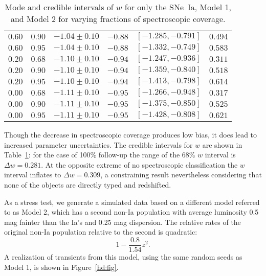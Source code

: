 \documentclass[preprint]{elsarticle}
\begin{document}
\begin{table}
\begin{tabular}{|c|c|cccc|}
$0.60$ &$0.90$ &$-1.04 \pm 0.10$ &$-0.88$ & $[-1.285, -0.791]$ & $0.494$ \\
$0.60$ &$0.95$ &$-1.04 \pm 0.10$ &$-0.88$ & $[-1.332, -0.749]$ & $0.583$ \\
$0.20$ &$0.68$ &$-1.10 \pm 0.10$ &$-0.94$ & $[-1.247, -0.936]$ & $0.311$ \\
$0.20$ &$0.90$ &$-1.10 \pm 0.10$ &$-0.94$ & $[-1.359, -0.840]$ & $0.518$ \\
$0.20$ &$0.95$ &$-1.10 \pm 0.10$ &$-0.94$ & $[-1.413, -0.798]$ & $0.614$ \\
$0.00$ &$0.68$ &$-1.11 \pm 0.10$ &$-0.95$ & $[-1.266, -0.948]$ & $0.317$ \\
$0.00$ &$0.90$ &$-1.11 \pm 0.10$ &$-0.95$ & $[-1.375, -0.850]$ & $0.525$ \\
$0.00$ &$0.95$ &$-1.11 \pm 0.10$ &$-0.95$ & $[-1.428, -0.808]$ & $0.621$ \\
\hline
\end{tabular}
\caption{Mode and credible intervals of $w$ for only the SNe~Ia, Model 1, and Model 2 for varying
fractions of spectroscopic coverage. \label{seed2:tab}}
\end{table}


Though the decrease in spectroscopic coverage produces low bias, it does lead to
increased parameter uncertainties.
The credible intervals for $w$ are shown in Table~\ref{seed2:tab}:
for the case of 100\% follow-up the range of the 68\% $w$ interval is $\Delta w = 0.281$. 
At the opposite extreme of no spectroscopic classification the $w$ interval inflates to
$\Delta w = 0.309$, a constraining result nevertheless considering that none of the
objects are directly typed and redshifted.





As a stress test, we generate a simulated data based on a different model
referred to as Model 2, which
has a second non-Ia population with average luminosity 0.5 mag fainter
than the Ia's and 0.25 mag dispersion.
The relative rates of the original non-Ia population relative to the second is quadratic:
\begin{equation}
1 -\frac{0.8}{1.54}z^2.
\end{equation}
A realization of transients from this model, using the same random seeds
as Model 1, is shown in Figure~\ref{hd:fig}.
\end{document}

